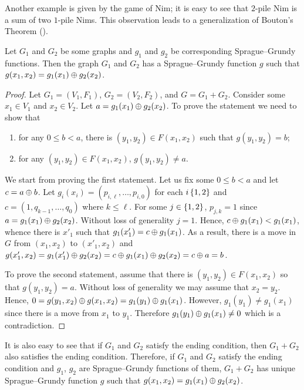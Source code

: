 Another example is given by the game of Nim; it is easy to see that
$2$-pile Nim is a sum of two $1$-pile Nims. This observation leads to a
generalization of Bouton's Theorem ().
\begin{theorem}
    Let $G_1$ and $G_2$ be some graphs and $g_1$ and $g_2$ be corresponding
    Sprague--Grundy functions. Then the graph $G_1$ and $G_2$ has a
    Sprague--Grundy function $g$ such that
    $g(x_1, x_2) = g_1(x_1) \oplus g_2(x_2)$.
\end{theorem}
\begin{proof}
    Let $G_1 = (V_1, F_1)$, $G_2 = (V_2, F_2)$, and $G = G_1 + G_2$.
    Consider some $x_1 \in V_1$ and $x_2 \in V_2$.
    Let $a = g_1(x_1) \oplus g_2(x_2)$. To prove the statement we need to
    show that
    \begin{enumerate}
        \item for any $0 \le b < a$, there is $(y_1, y_2) \in F(x_1, x_2)$ such
            that $g(y_1, y_2) = b$;
        \item for any $(y_1, y_2) \in F(x_1, x_2)$, $g(y_1, y_2) \neq a$.
    \end{enumerate}

    We start from proving the first statement.
    Let us fix some $0 \le b < a$ and let $c = a \oplus b$.
    Let $g_i(x_i) = (p_{i, \ell}, \dots, p_{i, 0})$ for each $i \set{1, 2}$ and
    $c = (1, q_{k - 1}, \dots, q_0)$ where $k \le \ell$.
    For some $j \in \set{1, 2}$, $p_{j, k} = 1$ since
    $a = g_1(x_1) \oplus g_2(x_2)$. Without loss of generality $j = 1$.
    Hence, $c \oplus g_1(x_1) < g_1(x_1)$, whence there is $x'_1$ such
    that $g_1(x'_1) = c \oplus g_1(x_1)$. As a result, there is a move in
    $G$ from $(x_1, x_2)$ to $(x'_1, x_2)$ and
    $g(x'_1, x_2) = g_1(x'_1) \oplus g_2(x_2) =
        c \oplus g_1(x_1) \oplus g_2(x_2) =
        c \oplus a = b$.

    To prove the second statement, assume that there is
    $(y_1, y_2) \in F(x_1, x_2)$ so that $g(y_1, y_2) = a$. Without loss of
    generality we may assume that $x_2 = y_2$. Hence,
    $0 = g(y_1, x_2) \oplus g(x_1, x_2) = g_1(y_1) \oplus g_1(x_1)$.
    However, $g_1(y_1) \neq g_1(x_1)$ since there is a move from $x_1$ to $y_1$.
    Therefore $g_1(y_1) \oplus g_1(x_1) \neq 0$ which is a contradiction.
\end{proof}
It is also easy to see that if $G_1$ and $G_2$ satisfy the ending condition,
then $G_1 + G_2$ also satisfies the ending condition. Therefore, if $G_1$ and
$G_2$ satisfy the ending condition and $g_1$, $g_2$ are Sprague--Grundy
functions of them, $G_1 + G_2$ has unique Sprague--Grundy function $g$ such that
$g(x_1, x_2) = g_1(x_1) \oplus g_2(x_2)$.

